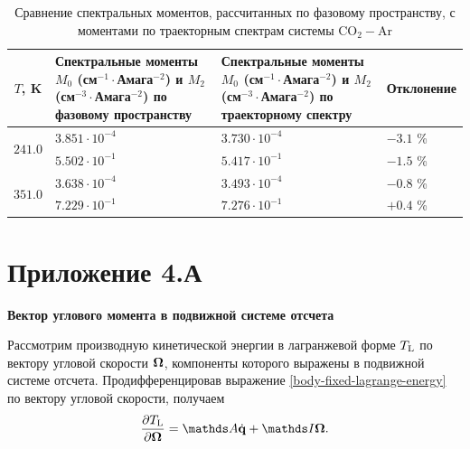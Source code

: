 \begin{table}[H]
    \caption{Сравнение спектральных моментов, рассчитанных по фазовому пространству, с моментами по траекторным спектрам системы CO$_2-$Ar}
    \begin{tabular}{c >{\centering}p{6cm} >{\centering}p{6cm} >{\centering}p{3cm}}
        \toprule
        $T$, K & Спектральные моменты $M_0$ (см$^{-1} \cdot$Амага$^{-2}$) и $M_2$ (см$^{-3} \cdot$Амага$^{-2}$) по фазовому пространству & Спектральные моменты $M_0$ (см$^{-1} \cdot$Амага$^{-2}$) и $M_2$ (см$^{-3} \cdot$Амага$^{-2}$) по траекторному спектру & Отклонение \tabularnewline
        \midrule
        \multirow{2}{*}{$241.0$} & $3.851 \cdot 10^{-4}$ & $3.730 \cdot 10^{-4}$ & $-3.1$ \%  \tabularnewline
                                 & $5.502 \cdot 10^{-1}$ & $5.417 \cdot 10^{-1}$ & $-1.5$ \%  \tabularnewline
        \midrule
        \multirow{2}{*}{$351.0$} & $3.638 \cdot 10^{-4}$ & $3.493 \cdot 10^{-4}$ & $-0.8$ \%  \tabularnewline
                                 & $7.229 \cdot 10^{-1}$ & $7.276 \cdot 10^{-1}$ & $+0.4$ \%  \tabularnewline
        \bottomrule
    \end{tabular}
    \label{table:co2ar-moments}
\end{table}

    \chapter*{Приложение 4.А}
    {\Large\textbf{Вектор углового момента в подвижной системе отсчета}} \label{appendix:angular-momentum-body-fixed}
    \vspace{0.5cm}
    
    Рассмотрим производную кинетической энергии в лагранжевой форме $T_\text{L}$ по вектору угловой скорости $\boldsymbol{\Omega}$, компоненты которого выражены в подвижной системе отсчета. Продифференцировав выражение \eqref{body-fixed-lagrange-energy} по вектору угловой скорости, получаем 
    \begin{gather}
        \frac{\partial \Tl}{\partial \bOmega} = \bbA \dot{\mf{q}} + \bbI \bOmega. \label{appendix-angular-momentum1}
    \end{gather}

